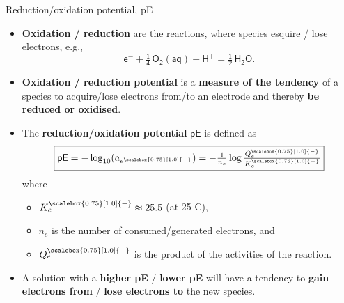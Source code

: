 \begin{frame}{Reduction/oxidation potential, pE}
\begin{itemize}
	\item  \alert{\textbf{Oxidation / reduction}} are the reactions, where species esquire / lose electrons, e.g., 
	\[
	\mathsf{e^- + \tfrac{1}{4} \, O_2(aq) + H^+ = \tfrac{1}{2} \, H_2O.}
	\]
	\vskip -10pt
	\pause
\item \alert{\textbf{Oxidation / reduction potential}} is a {\bf measure of the tendency} of a species to acquire/lose electrons from/to an electrode and thereby {\bf be reduced or oxidised}. 
%
	\pause
\item The \alert{\textbf{reduction/oxidation potential}} $\mathsf{pE}$ is defined as
%
\[
\boxed{ \mathsf{pE} = - \log_{10} (a_{e^{\scalebox{0.75}[1.0]{-}}}) = -\tfrac{1}{n_e} \log \tfrac{Q^{\scalebox{0.75}[1.0]{-}}_e}{K^{\scalebox{0.75}[1.0]{-}}_e} }
\]
\vskip -5pt
%
where 
\begin{itemize}
	\item $K^{\scalebox{0.75}[1.0]{-}}_e \approx 25.5$ (at 25 \textdegree C), 
	\item $n_e$ is the number of consumed/generated electrons, and 
	\item $Q^{\scalebox{0.75}[1.0]{-}}_e$ is the product of the activities of the reaction. 
\end{itemize}
%
	\pause
\item A solution with a {\bf higher pE} /  {\bf lower pE} will have a tendency to {\bf gain electrons from} / {\bf lose electrons to} the new species.
%
\end{itemize}

\end{frame}
%
%
